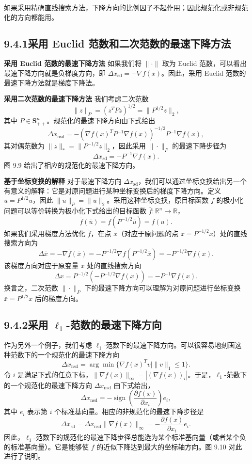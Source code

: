 \documentclass[UTF8, 12pt, fontset=fandol, oneside]{ctexart}
\begin{document}
如果采用精确直线搜索方法，下降方向的比例因子不起作用；因此规范化或非规范化的方向都能用。

\subsection*{9.4.1\quad 采用 Euclid 范数和二次范数的最速下降方法}

\noindent\textbf{采用 Euclid 范数的最速下降方法}\quad
如果我们将 $\|\cdot\|$ 取为 Euclid 范数，可以看出最速下降方向就是负梯度方向，即 $\Delta x_{\mathrm{sd}}=-\nabla f(x)$。因此，采用 Euclid 范数的最速下降方法就是梯度下降法。

\noindent\textbf{采用二次范数的最速下降方法}\quad
我们考虑二次范数
\[
\|z\|_P=(z^TPz)^{1/2}=\|P^{1/2}z\|_2,
\]
其中 $P\in\mathbf{S}_{++}^n$。规范化的最速下降方向由下式给出
\[
\Delta x_{\mathrm{nsd}}=-(\nabla f(x)^TP^{-1}\nabla f(x))^{-1/2}P^{-1}\nabla f(x),
\]
其对偶范数为 $\|z\|_\ast=\|P^{-1/2}z\|_2$，因此采用 $\|\cdot\|_P$ 的最速下降步径为
\begin{equation}
\Delta x_{\mathrm{sd}}=-P^{-1}\nabla f(x).
\tag{9.25}
\end{equation}
图 9.9 给出了相应的规范化的最速下降方向。

\noindent\textbf{基于坐标变换的解释}\quad
对于最速下降方向 $\Delta x_{\mathrm{sd}}$，我们可以通过坐标变换给出另一个有意义的解释：它是对原问题进行某种坐标变换后的梯度下降方向。定义 $\bar{u}=P^{1/2}u$，因此 $\|u\|_P=\|\bar{u}\|_2$。采用这种坐标变换，原目标函数 $f$ 的极小化问题可以等价转换为极小化下式给出的目标函数 $\bar{f}:\mathbb{R}^n\to\mathbb{R}$，
\[
\bar{f}(\bar{u})=f(P^{-1/2}\bar{u})=f(u).
\]
如果我们采用梯度方法优化 $\bar{f}$，在点 $\bar{x}$（对应于原问题的点 $x=P^{-1/2}\bar{x}$）处的直线搜索方向为
\[
\Delta\bar{x}=-\nabla\bar{f}(\bar{x})=-P^{-1/2}\nabla f(P^{-1/2}\bar{x})=-P^{-1/2}\nabla f(x).
\]
该梯度方向对应于原变量 $x$ 处的直线搜索方向
\[
\Delta x=P^{-1/2}(-P^{-1/2}\nabla f(x))=-P^{-1}\nabla f(x).
\]
换言之，二次范数 $\|\cdot\|_P$ 下的最速下降方向可以理解为对原问题进行坐标变换 $\bar{x}=P^{1/2}x$ 后的梯度方向。

\subsection*{9.4.2\quad 采用 $\ell_1$-范数的最速下降方向}

作为另外一个例子，我们考虑 $\ell_1$-范数下的最速下降方向。可以很容易地刻画这种范数下的一个规范化的最速下降方向
\[
\Delta x_{\mathrm{nsd}}=\arg\min\{\nabla f(x)^Tv\mid \|v\|_1\leq1\}.
\]
令 $i$ 是满足下式的任意下标，$\|\nabla f(x)\|_\infty=|(\nabla f(x))_i|$。于是，$\ell_1$-范数下的一个规范化的最速下降方向 $\Delta x_{\mathrm{nsd}}$ 由下式给出，
\[
\Delta x_{\mathrm{nsd}}=-\operatorname{sign}\left(\frac{\partial f(x)}{\partial x_i}\right)e_i,
\]
其中 $e_i$ 表示第 $i$ 个标准基向量。相应的非规范化的最速下降步径是
\[
\Delta x_{\mathrm{sd}}=\Delta x_{\mathrm{nsd}}\|\nabla f(x)\|_\infty
=-\frac{\partial f(x)}{\partial x_i}e_i.
\]
因此，$\ell_1$-范数下的规范化的最速下降步径总能选为某个标准基向量（或者某个负的标准基向量）。它是能够使 $f$ 的近似下降达到最大的坐标轴方向。图 9.10 对此进行了说明。
\end{document}
